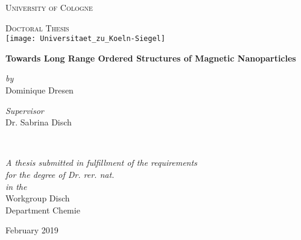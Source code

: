 \begin{titlepage}
\begin{center}
{\scshape\LARGE University of Cologne\par}
\vspace{1cm} %
\textsc{\Large Doctoral Thesis}\\[0.5cm] %
\vspace{.5cm}
\texttt{[image: Universitaet\_zu\_Koeln-Siegel]}

{\huge \bfseries Towards Long Range Ordered Structures of Magnetic Nanoparticles\par}
\vspace{0.4cm} %

\begin{minipage}[t]{0.4\textwidth}
\begin{flushleft} \large
\centering
\textit{by}\\
Dominique Dresen
\end{flushleft}
\end{minipage}
\begin{minipage}[t]{0.4\textwidth}
\begin{flushright} \large
\centering
\textit{Supervisor}\\
Dr. Sabrina Disch %
\end{flushright}
\end{minipage}\\[3cm]

\vfill

\large \textit{A thesis submitted in fulfillment of the requirements\\ for the degree of Dr. rer. nat.}\\[0.3cm]
\textit{in the}\\[0.4cm]
Workgroup Disch\\Department Chemie\\[2cm]

\vfill

{\large February 2019}
\end{center}

\end{titlepage}